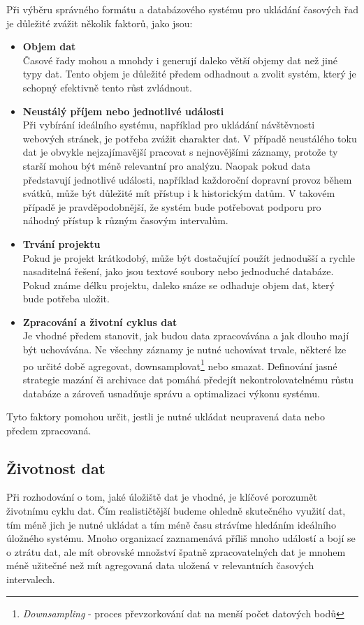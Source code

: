 Při výběru správného formátu a databázového systému pro ukládání časových řad je důležité zvážit několik faktorů, jako jsou:
\begin{itemize}
    \item \textbf{Objem dat} \\ 
    Časové řady mohou a mnohdy i generují daleko větší objemy dat než jiné typy dat. Tento objem je důležité předem odhadnout a
    zvolit systém, který je schopný efektivně tento růst zvládnout.
    \item \textbf{Neustálý příjem nebo jednotlivé události} \\
    Při vybírání ideálního systému, například pro ukládání návštěvnosti webových stránek, je potřeba zvážit charakter dat.  
    V případě neustálého toku dat je obvykle nejzajímavější pracovat s nejnovějšími záznamy, protože ty starší mohou být méně relevantní pro analýzu.  
    Naopak pokud data představují jednotlivé události, například každoroční dopravní provoz během svátků, může být důležité mít přístup i k historickým datům. 
    V takovém případě je pravděpodobnější, že systém bude potřebovat podporu pro náhodný přístup k různým časovým intervalům.
    \item \textbf{Trvání projektu} \\
    Pokud je projekt krátkodobý, může být dostačující použít jednodušší a rychle nasaditelná řešení, jako jsou textové soubory nebo jednoduché databáze.
    Pokud známe délku projektu, daleko snáze se odhaduje objem dat, který bude potřeba uložit.
    \item \textbf{Zpracování a životní cyklus dat} \\ 
    Je vhodné předem stanovit, jak budou data zpracovávána a jak dlouho mají být uchovávána.  
    Ne všechny záznamy je nutné uchovávat trvale, některé lze po určité době agregovat, 
    downsamplovat\footnote{\textit{Downsampling} - proces převzorkování dat na menší počet datových bodů} nebo smazat.  
    Definování jasné strategie mazání či archivace dat pomáhá předejít nekontrolovatelnému růstu databáze a zároveň usnadňuje správu a optimalizaci výkonu systému.  
\end{itemize}    

Tyto faktory pomohou určit, jestli je nutné ukládat neupravená data nebo předem zpracovaná.

\subsection{Životnost dat}
Při rozhodování o tom, jaké úložiště dat je vhodné, je klíčové porozumět životnímu cyklu dat. 
Čím realističtější budeme ohledně skutečného využití dat, tím méně jich je nutné ukládat a tím méně času strávíme hledáním ideálního úložného systému. 
Mnoho organizací zaznamenává příliš mnoho událostí a bojí se o ztrátu dat, ale mít obrovské množství špatně zpracovatelných dat 
je mnohem méně užitečné než mít agregovaná data uložená v relevantních časových intervalech.

